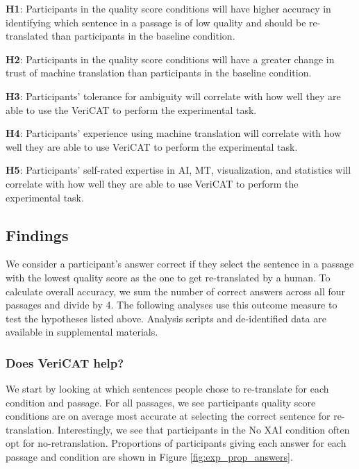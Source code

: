 \begin{compacthang}
    \item \textbf{H1}: Participants in the quality score conditions will have higher accuracy in identifying which sentence in a passage is of low quality and should be re-translated than participants in the baseline condition. 
    \item \textbf{H2}: Participants in the quality score conditions will have a greater change in trust of machine translation than participants in the baseline condition. 
    \item \textbf{H3}: Participants’ tolerance for ambiguity will correlate with how well they are able to use the VeriCAT to perform the experimental task.
    \item \textbf{H4}: Participants’ experience using machine translation will correlate with how well they are able to use VeriCAT to perform the experimental task.
    \item \textbf{H5}: Participants’ self-rated expertise in AI, MT, visualization, and statistics will correlate with how well they are able to use VeriCAT to perform the experimental task.   
\end{compacthang}

\subsection{Findings}

We consider a participant’s answer correct if they select the sentence in a passage with the lowest quality score as the one to get re-translated by a human. To calculate overall accuracy, we sum the number of correct answers across all four passages and divide by 4. The following analyses use this outcome measure to test the hypotheses listed above. Analysis scripts and de-identified data are available in supplemental materials. 

\subsubsection{\textbf{Does VeriCAT help?}}

We start by looking at which sentences people chose to re-translate for each condition and passage. For all passages, we see participants quality score conditions are on average most accurate at selecting the correct sentence for re-translation. Interestingly, we see that participants in the No XAI condition often opt for no-retranslation. Proportions of participants giving each answer for each passage and condition are shown in Figure \ref{fig:exp_prop_answers}.

